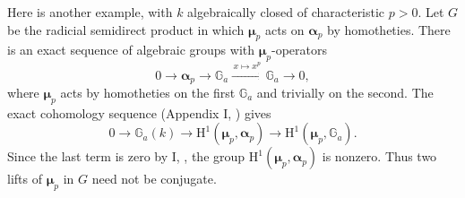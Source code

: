 Here is another example, with \(k\) algebraically closed of
characteristic \(p>0\).  Let \(G\) be the radicial semidirect
product in which \(\boldsymbol\mu_p\) acts on
\(\boldsymbol\alpha_p\) by homotheties.  There is an exact
sequence of algebraic groups with \(\boldsymbol\mu_p\)-operators
\[
  0\longrightarrow\boldsymbol\alpha_p
   \longrightarrow\mathbb G_a
   \xrightarrow{\,x\longmapsto x^p\,}\mathbb G_a
   \longrightarrow0,
\]
where \(\boldsymbol\mu_p\) acts by homotheties on the first
\(\mathbb G_a\) and trivially on the second.  The exact
cohomology sequence (Appendix I, ) gives
\[
  0\longrightarrow\mathbb G_a(k)
   \longrightarrow\mathrm H^1(\boldsymbol\mu_p,\boldsymbol\alpha_p)
   \longrightarrow\mathrm H^1(\boldsymbol\mu_p,\mathbb G_a).
\]
Since the last term is zero by I, , the group
\(\mathrm H^1(\boldsymbol\mu_p,\boldsymbol\alpha_p)\) is nonzero.
Thus two lifts of \(\boldsymbol\mu_p\) in \(G\) need not be
conjugate.

